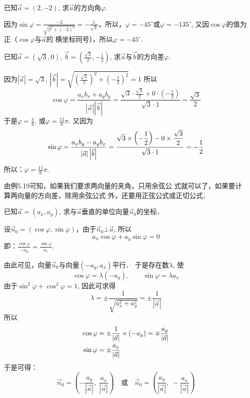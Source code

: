 \begin{example}
    已知$\vec{a}=(2,-2)$, 求$\vec{a}$的方向角$\varphi$.
\end{example}

\begin{solution}
    因为$\sin\varphi=\frac{-2}{\sqrt{2^2+(-2)^2}}=-\frac{1}{\sqrt{2}}$，所以，$\varphi=-45^{\circ}$或$\varphi=-135^{\circ}$, 又因$\cos\varphi$的值为正（$\cos\varphi$与$\vec{a}$的
横坐标同号），所以$\varphi=-45^{\circ}$.
\end{solution}


\begin{example}
    已知$\vec{a}=(\sqrt{3},0)$, $\vec{b}=\left(\frac{\sqrt{3}}{2},-\frac{1}{2}\right)$, 求$\vec{a}$与$\vec{b}$的方向差$\varphi$.
\end{example}

\begin{solution}
因为$|\vec{a}|=\sqrt{3}$, $|\vec{b}|=\sqrt{\left(\frac{\sqrt{3}}{2}\right)^2+\left(-\frac{1}{2}\right)^2}=1$
所以
\[\cos\varphi=\frac{a_xb_x+a_yb_y}{|\vec{a}|\left|\vec{b}\right|}=\frac{\sqrt{3}\cdot \frac{\sqrt{3}}{2}+0\cdot \left(-\frac{1}{2}\right)}{\sqrt{3}\cdot 1}=\frac{\sqrt{3}}{2}\]
于是$\varphi=\frac{\pi}{6}$, 或$\varphi=\frac{11}{6}\pi$. 又因为
\[\sin\varphi=\dfrac{a_xb_y-a_yb_x}{|\vec{a}|\left|\vec{b}\right|}=\dfrac{\sqrt{3}\times \left(-\dfrac{1}{2}\right)-0\times \dfrac{\sqrt{3}}{2}}{\sqrt{3}\cdot 1}=-\dfrac{1}{2}\]
所以：$\varphi=\frac{11}{6}\pi$.
\end{solution}

由例5.19可知，如果我们要求两向量的夹角，只用余弦公
式就可以了，如果要计算两向量的方向差，除用余弦公式
外，还要用正弦公式或正切公式．


\begin{example}
    已知$\vec{a}=(a_x,a_y)$, 求与$\vec{a}$垂直的单位向量$\vec{n}_0$的坐标．
\end{example}

\begin{solution}
    设$\vec{n}_0=(\cos\varphi,\sin\varphi)$，由于$\vec{n}_0\bot \vec{a}$, 所以
\[a_x\cos\varphi+a_y\sin\varphi= 0\]
即：$\frac{\cos\varphi}{-a_y}=\frac{\sin\varphi}{a_x}$.

由此可见，向量$\vec{n}_0$与向量$(-a_y,a_x)$平行．
于是存在数$\lambda$, 使
\[\cos\varphi=\lambda(-a_y),\qquad \sin\varphi=\lambda a_x\]
由于$\sin^2\varphi +\cos^2\varphi =1$, 因此可求得
\[\lambda=\pm\frac{1}{\sqrt{a^2_x+a^2_y}}=\pm\frac{1}{|\vec{a}|}\]
所以
\[\begin{split}
    \cos\varphi&=\pm\dfrac{1}{|\vec{a}|}\times (-a_y)=\mp\dfrac{a_y}{|\vec{a}|}\\
    \sin\varphi&=\pm\dfrac{a_x}{|\vec{a}|}
\end{split}\]
于是可得：
\[\vec{n}_0=\left(-\frac{a_y}{|\vec{a}|},\; \frac{a_x}{|\vec{a}|}\right)\quad \text{或}\quad \vec{n}_0=\left(\frac{a_y}{|\vec{a}|},\; -\frac{a_x}{|\vec{a}|}\right)\]
\end{solution}

